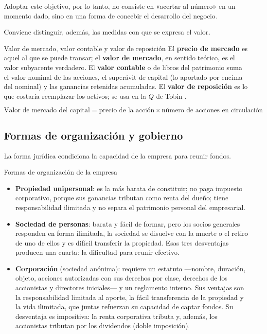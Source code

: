 Adoptar este objetivo, por lo tanto, no consiste en «acertar al número» en un momento dado, sino en una forma de concebir el desarrollo del negocio.

Conviene distinguir, además, las medidas con que se expresa el valor.

\begin{definicion}{Valor de mercado, valor contable y valor de reposición}
El \textbf{precio de mercado} es aquel al que se puede transar; el \textbf{valor de mercado}, en sentido teórico, es el valor subyacente verdadero. El \textbf{valor contable} o de libros del patrimonio suma el valor nominal de las acciones, el superávit de capital (lo aportado por encima del nominal) y las ganancias retenidas acumuladas. El \textbf{valor de reposición} es lo que costaría reemplazar los activos; se usa en la $Q$ de Tobin .
\end{definicion}

\begin{formulaBox}
\[
\text{Valor de mercado del capital} = \text{precio de la acción}\times\text{número de acciones en circulación}
\]
\end{formulaBox}

\subsection{Formas de organización y gobierno}\label{sec:u1-agencia}

La forma jurídica condiciona la capacidad de la empresa para reunir fondos.

\begin{definicion}{Formas de organización de la empresa}
\begin{itemize}
\item \textbf{Propiedad unipersonal}: es la más barata de constituir; no paga impuesto corporativo, porque sus ganancias tributan como renta del dueño; tiene responsabilidad ilimitada y no separa el patrimonio personal del empresarial.
\item \textbf{Sociedad de personas}: barata y fácil de formar, pero los socios generales responden en forma ilimitada, la sociedad se disuelve con la muerte o el retiro de uno de ellos y es difícil transferir la propiedad. Esas tres desventajas producen una cuarta: la dificultad para reunir efectivo.
\item \textbf{Corporación} (sociedad anónima): requiere un estatuto —nombre, duración, objeto, acciones autorizadas con sus derechos por clase, derechos de los accionistas y directores iniciales— y un reglamento interno. Sus ventajas son la responsabilidad limitada al aporte, la fácil transferencia de la propiedad y la vida ilimitada, que juntas refuerzan su capacidad de captar fondos. Su desventaja es impositiva: la renta corporativa tributa y, además, los accionistas tributan por los dividendos (doble imposición).
\end{itemize}
\end{definicion}

